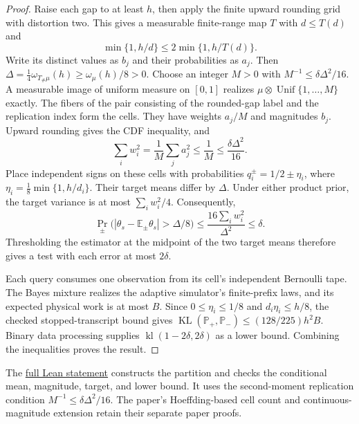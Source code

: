 \begin{proof}
Raise each gap to at least $h$, then apply the finite upward rounding
grid with distortion two. This gives a measurable finite-range map $T$
with $d\le T(d)$ and
\[
 \min\{1,h/d\}\le2\min\{1,h/T(d)\}.
\]
Write its distinct values as $b_j$ and their probabilities as $a_j$.
Then $\Delta=\frac14\omega_{T_\#\mu}(h)\ge\omega_\mu(h)/8>0$.
Choose an integer $M>0$ with
$M^{-1}\le\delta\Delta^2/16$.
A measurable image of uniform measure on $[0,1]$ realizes
$\mu\otimes\operatorname{Unif}\{1,\ldots,M\}$ exactly.
The fibers of the pair consisting of the rounded-gap label and the
replication index form the cells. They have weights $a_j/M$ and
magnitudes $b_j$. Upward rounding gives the CDF inequality, and
\[
 \sum_iw_i^2=\frac1M\sum_j a_j^2
 \le\frac1M\le\frac{\delta\Delta^2}{16}.
\]
Place independent signs on these cells with probabilities
$q_i^\pm=1/2\pm\eta_i$, where
$\eta_i=\frac18\min\{1,h/d_i\}$.
Their target means differ by $\Delta$.
Under either product prior, the target variance is at most
$\sum_iw_i^2/4$. Consequently,
\[
 \Pr_\pm\bigl(|\theta_s-\mathbb E_\pm\theta_s|>\Delta/8\bigr)
 \le\frac{16\sum_iw_i^2}{\Delta^2}\le\delta.
\]
Thresholding the estimator at the midpoint of the two target means
therefore gives a test with each error at most $2\delta$.

Each query consumes one observation from its cell's independent
Bernoulli tape. The Bayes mixture realizes the adaptive simulator's
finite-prefix laws, and its expected physical work is at most $B$.
Since $0\le\eta_i\le1/8$ and $d_i\eta_i\le h/8$, the checked
stopped-transcript bound gives
$\operatorname{KL}(\mathbb P_+,\mathbb P_-)\le(128/225)h^2B$.
Binary data processing supplies
$\operatorname{kl}(1-2\delta,2\delta)$ as a lower bound.
Combining the inequalities proves the result.
\end{proof}

The \href{https://github.com/davidiach/adaptive-threshold-estimation/blob/73511713e46e71ac977e191bb128cdd8e951ff64/lean/ThresholdHC/ObservedState/Finite.lean}{full Lean statement}
constructs the partition and checks the conditional mean, magnitude,
target, and lower bound. It uses the second-moment replication condition
$M^{-1}\le\delta\Delta^2/16$.
The paper's Hoeffding-based cell count and continuous-magnitude
extension retain their separate paper proofs.
